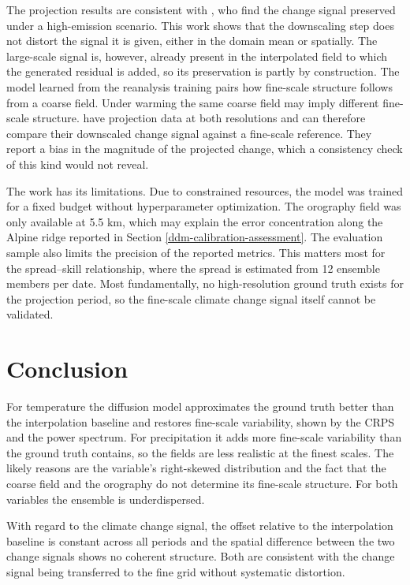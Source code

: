 \documentclass[
]{krantz}
\begin{document}
The projection results are consistent with \citet{aich2026}, who find the change signal preserved under a high-emission scenario. This work shows that the downscaling step does not distort the signal it is given,
either in the domain mean or spatially. The large-scale signal is, however, already present in the interpolated field to which the generated residual is added, so its preservation is partly by construction.
The model learned from the reanalysis training pairs how fine-scale structure follows from a coarse field. Under warming the same coarse field may imply different fine-scale structure.
\citet{addison2026} have projection data at both resolutions and can therefore compare their downscaled change signal against a fine-scale reference.
They report a bias in the magnitude of the projected change, which a consistency check of this kind would not reveal.

The work has its limitations. Due to constrained resources, the model was trained for a fixed budget without hyperparameter optimization.
The orography field was only available at 5.5 km, which may explain the error concentration along the Alpine ridge reported in Section \ref{ddm-calibration-assessment}.
The evaluation sample also limits the precision of the reported metrics. This matters most for the
spread--skill relationship, where the spread is estimated from 12 ensemble members per date.
Most fundamentally, no high-resolution ground truth exists for the projection period, so the fine-scale climate change signal itself cannot be validated.

\section{Conclusion}\label{conclusion-1}

For temperature the diffusion model approximates the ground truth better than the interpolation baseline and restores fine-scale variability, shown by the CRPS and the power spectrum.
For precipitation it adds more fine-scale variability than the ground truth contains, so the fields are less realistic at the finest scales.
The likely reasons are the variable's right-skewed distribution and the fact that the coarse field and the orography do not determine its fine-scale structure.
For both variables the ensemble is underdispersed.

With regard to the climate change signal, the offset relative to the interpolation baseline is constant across all periods and the spatial difference between the two change signals shows no coherent structure.
Both are consistent with the change signal being transferred to the fine grid without systematic distortion.
\end{document}
